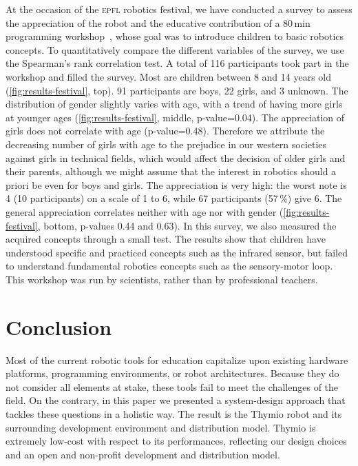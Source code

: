 \documentclass[letterpaper, 10 pt, conference]{ieeeconf}  %
\begin{document}
At the occasion of the \textsc{epfl} robotics festival, we have conducted a survey to assess the appreciation of the robot and the educative contribution of a 80\,min programming workshop~\cite{thymio2012arsi}, whose goal was to introduce children to basic robotics concepts.
To quantitatively compare the different variables of the survey, we use the Spearman's rank correlation test.
A total of 116 participants took part in the workshop and filled the survey.
Most are children between 8 and 14 years old (\ref{fig:results-festival}, top).
91 participants are boys, 22 girls, and 3 unknown.
The distribution of gender slightly varies with age, with a trend of having more girls at younger ages (\ref{fig:results-festival}, middle, p-value=0.04).
The appreciation of girls does not correlate with age (p-value=0.48).
Therefore we attribute the decreasing number of girls with age to the prejudice in our western societies against girls in technical fields, which would affect the decision of older girls and their parents, although we might assume that the interest in robotics should a priori be even for boys and girls.
The appreciation is very high: the worst note is 4 (10 participants) on a scale of 1 to 6, while 67 participants (57\,\%) give 6.
The general appreciation correlates neither with age nor with gender (\ref{fig:results-festival}, bottom, p-values 0.44 and 0.63).
In this survey, we also measured the acquired concepts through a small test.
The results show that children have understood specific and practiced concepts such as the infrared sensor, but failed to understand fundamental robotics concepts such as the sensory-motor loop.
This workshop was run by scientists, rather than by professional teachers.



\section{Conclusion}

Most of the current robotic tools for education capitalize upon existing hardware platforms, programming environments, or robot architectures.
Because they do not consider all elements at stake, these tools fail to meet the challenges of the field.
On the contrary, in this paper we presented a system-design approach that tackles these questions in a holistic way.
The result is the Thymio robot and its surrounding development environment and distribution model.
Thymio is extremely low-cost with respect to its performances, reflecting our design choices and an open and non-profit development and distribution model.
\end{document}
